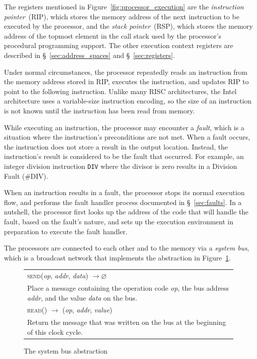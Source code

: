 The registers mentioned in Figure~\ref{fig:processor_execution} are the
\textit{instruction pointer}~(RIP), which stores the memory  address of the
next instruction to be executed by the processor, and the
\textit{stack pointer}~(RSP), which stores the memory address of the topmost
element in the call stack used by the processor's procedural programming
support. The other execution context registers are described in
\S~\ref{sec:address_spaces} and \S~\ref{sec:registers}.

Under normal circumstances, the processor repeatedly reads an instruction from
the memory address stored in RIP, executes the instruction, and updates RIP to
point to the following instruction. Unlike many RISC architectures, the Intel
architecture uses a variable-size instruction encoding, so the size of an
instruction is not known until the instruction has been read from memory.

While executing an instruction, the processor may encounter a \textit{fault},
which is a situation where the instruction's preconditions are not met. When
a fault occurs, the instruction does not store a result in the output location.
Instead, the instruction's result is considered to be the fault that occurred.
For example, an integer division instruction \texttt{DIV} where the divisor is
zero results in a Division Fault (\#DIV).

When an instruction results in a fault, the processor stops its normal
execution flow, and performs the fault handler process documented in
\S~\ref{sec:faults}. In a nutshell, the processor first looks up the address of
the code that will handle the fault, based on the fault's nature, and sets up
the execution environment in preparation to execute the fault handler.

The processors are connected to each other and to the memory via a
\textit{system bus}, which is a broadcast network that implements the
abstraction in Figure~\ref{fig:bus_abstraction}.

\begin{figure}[hbt]
  \centering
  \begin{tabularx}{\columnwidth}{| X |}
  \hline
  \textsc{send}(\textit{op}, \textit{addr}, \textit{data})
  $ \rightarrow \varnothing $ \\
  Place a message containing the operation code \textit{op}, the bus address
  \textit{addr}, and the value \textit{data} on the bus. \\
  \hline
  \textsc{read}() $ \rightarrow $ (\textit{op}, \textit{addr},
  \textit{value}) \\
  Return the message that was written on the bus at the beginning of this
  clock cycle. \\
  \hline
  \end{tabularx}
  \caption{The system bus abstraction}
  \label{fig:bus_abstraction}
\end{figure}

